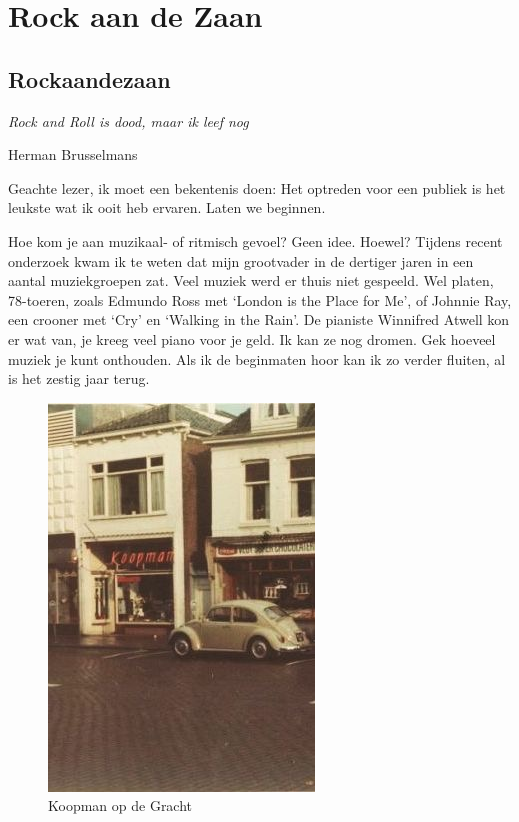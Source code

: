 \documentclass[12pt,twoside, openright]{memoir}
\begin{document}
\part{Rock aan de Zaan}

\chapter{Rockaandezaan}

\epigraph{\emph{Rock and Roll is dood, maar ik leef nog}}{Herman Brusselmans}

\noindent Geachte lezer, ik moet een bekentenis doen: Het optreden voor een publiek is het leukste wat ik ooit heb ervaren. Laten we beginnen.

Hoe kom je aan muzikaal- of ritmisch gevoel? Geen idee. Hoewel? Tijdens recent onderzoek kwam ik te weten dat mijn grootvader in de dertiger jaren in een aantal muziekgroepen zat. Veel muziek werd er thuis niet gespeeld. Wel platen, 78-toeren, zoals Edmundo Ross met `London is the Place for Me', of Johnnie Ray, een crooner met `Cry' en `Walking in the Rain'. De pianiste Winnifred Atwell kon er wat van, je kreeg veel piano voor je geld. Ik kan ze nog dromen. Gek hoeveel muziek je kunt onthouden. Als ik de beginmaten hoor kan ik zo verder fluiten, al is het zestig jaar terug. 

\begin{figure}
\includegraphics[width=\textwidth]{img/ch23/koopm}
\caption*{\footnotesize Koopman op de Gracht}
\end{figure}
\end{document}
